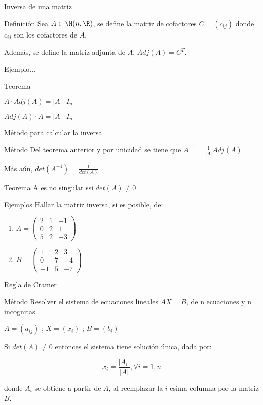{Inversa de una matriz}

\begin{block}{Definición}
Sea $A \in \M(n,\R)$, se define la matriz de cofactores $C=(c_{ij})$ 
donde $c_{ij}$ son los cofactores de $A$.

Además, se define la matriz adjunta de $A$, $Adj(A) = C^T$.
\end{block}

Ejemplo...

\begin{block}{Teorema}

 $A \cdot Adj(A) = |A| \cdot  I_n$

 $ Adj(A)  \cdot A= |A| \cdot  I_n$
\end{block}


{Método para calcular la inversa}

\begin{block}{Método}
Del teorema anterior y por unicidad se tiene que 
 $A^{-1} = \frac{1}{ |A|}Adj(A)$

Más aún, 
  $det(A^{-1})  = \frac{1}{ det(A)}$
\end{block}

\begin{block}{Teorema}
A es no singular ssi $det(A) \neq 0$
\end{block}


{Ejemplos}
Hallar la matriz inversa, si es posible, de:

\begin{enumerate}

\item
$A= \left(
\begin{array}{ccc}
2&1&-1\\
0&2&1\\
5&2&-3
\end{array}
\right)$

\item
$B= \left(
\begin{array}{ccc}
1&2&3\\
0&7&-4\\
-1&5&-7
\end{array}
\right)$

\end{enumerate}


{Regla de Cramer}

\begin{block}{Método}
Resolver el sistema de ecuaciones lineales $AX=B$, de n ecuaciones y n incognitas.
 
 $A=(a_{ij})$  ;  $X=(x_i)$  ;   $B= (b_i)$
 
Si  $det(A) \neq 0$ entonces el sistema tiene solución única, dada por:
 
$$x_i = \frac{|A_i|}{|A|}, \forall i=1,n$$
    
donde $A_i$ se obtiene a partir de $A$, al reemplazar la $i$-esima columna por la matriz $B$.

\end{block}


